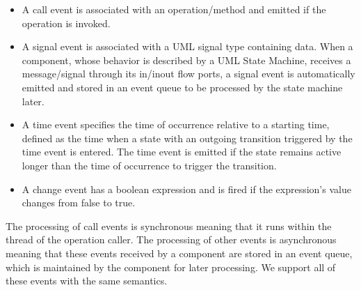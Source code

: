 \begin{itemize}[\footnotesize]
	\itemsep0em
	\item A call event is associated with an operation/method and emitted if the operation is invoked.
	
	\item A signal event is associated with a UML signal type containing data.
	When a component, whose behavior is described by a UML State Machine, receives a message/signal through its in/inout flow ports, a signal event is automatically emitted and stored in an event queue to be processed by the state machine later.
	
	\item A time event specifies the time of occurrence relative to a starting time, defined as the time when a state with an outgoing transition triggered by the time event is entered.
	The time event is emitted if the state remains active longer than the time of occurrence to trigger the transition.

	
	\item A change event has a boolean expression and is fired if the expression's value changes from false to true. 
\end{itemize}

The processing of call events is synchronous meaning that it runs within the thread of the operation caller.
The processing of other events is asynchronous meaning that these events received by a component are stored in an event queue, which is maintained by the component for later processing.
We support all of these events with the same semantics. 

